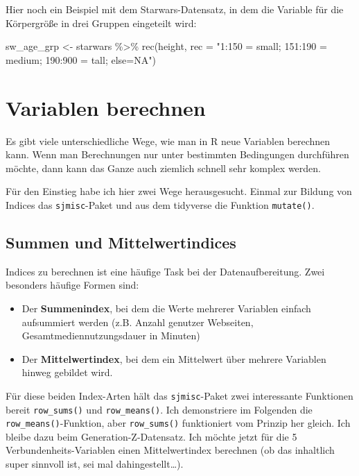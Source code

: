 \documentclass[
]{book}
\newenvironment{Shaded}{\begin{snugshade}}{\end{snugshade}}
\newcommand{\AttributeTok}[1]{\textcolor[rgb]{0.77,0.63,0.00}{#1}}
\newcommand{\FunctionTok}[1]{\textcolor[rgb]{0.00,0.00,0.00}{#1}}
\newcommand{\NormalTok}[1]{#1}
\newcommand{\OtherTok}[1]{\textcolor[rgb]{0.56,0.35,0.01}{#1}}
\newcommand{\SpecialCharTok}[1]{\textcolor[rgb]{0.00,0.00,0.00}{#1}}
\newcommand{\StringTok}[1]{\textcolor[rgb]{0.31,0.60,0.02}{#1}}
\begin{document}
Hier noch ein Beispiel mit dem Starwars-Datensatz, in dem die Variable für die Körpergröße in drei Gruppen eingeteilt wird:

\begin{Shaded}
\begin{Highlighting}[]
\NormalTok{sw\_age\_grp }\OtherTok{\textless{}{-}}\NormalTok{ starwars }\SpecialCharTok{\%\textgreater{}\%} 
  \FunctionTok{rec}\NormalTok{(height, }\AttributeTok{rec =} \StringTok{"1:150 = small; }
\StringTok{                     151:190 = medium; }
\StringTok{                     190:900 = tall; }
\StringTok{                     else=NA"}\NormalTok{)}
\end{Highlighting}
\end{Shaded}

\hypertarget{variablen-berechnen}{%
\section{Variablen berechnen}\label{variablen-berechnen}}

Es gibt viele unterschiedliche Wege, wie man in R neue Variablen berechnen kann. Wenn man Berechnungen nur unter bestimmten Bedingungen durchführen möchte, dann kann das Ganze auch ziemlich schnell sehr komplex werden.

Für den Einstieg habe ich hier zwei Wege herausgesucht. Einmal zur Bildung von Indices das \texttt{sjmisc}-Paket und aus dem tidyverse die Funktion \texttt{mutate()}.

\hypertarget{summen-und-mittelwertindices}{%
\subsection{Summen und Mittelwertindices}\label{summen-und-mittelwertindices}}

Indices zu berechnen ist eine häufige Task bei der Datenaufbereitung. Zwei besonders häufige Formen sind:

\begin{itemize}
\item
  Der \textbf{Summenindex}, bei dem die Werte mehrerer Variablen einfach aufsummiert werden (z.B. Anzahl genutzer Webseiten, Gesamtmediennutzungsdauer in Minuten)
\item
  Der \textbf{Mittelwertindex}, bei dem ein Mittelwert über mehrere Variablen hinweg gebildet wird.
\end{itemize}

Für diese beiden Index-Arten hält das \texttt{sjmisc}-Paket zwei interessante Funktionen bereit \texttt{row\_sums()} und \texttt{row\_means()}.
Ich demonstriere im Folgenden die \texttt{row\_means()}-Funktion, aber \texttt{row\_sums()} funktioniert vom Prinzip her gleich. Ich bleibe dazu beim Generation-Z-Datensatz. Ich möchte jetzt für die 5 Verbundenheits-Variablen einen Mittelwertindex berechnen (ob das inhaltlich super sinnvoll ist, sei mal dahingestellt\ldots).
\end{document}
